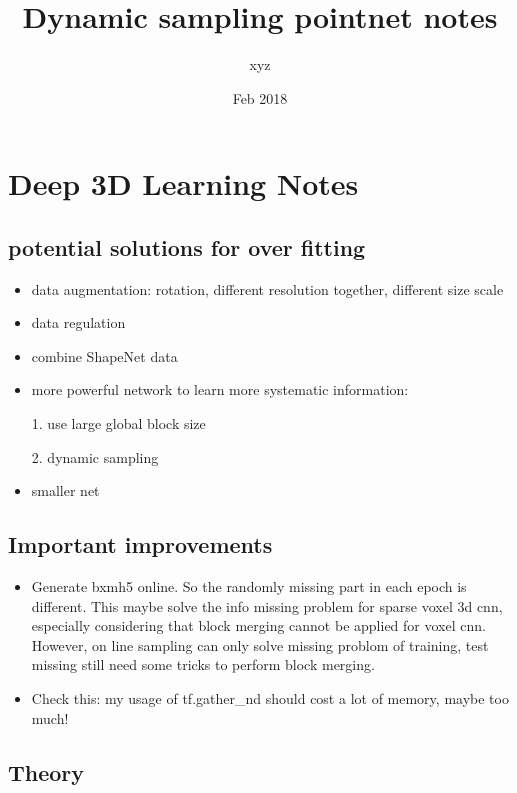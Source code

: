 \documentclass{article}
\title{Dynamic sampling pointnet notes}
\author{xyz}
\date{Feb 2018}
\begin{document}
\begin{titlepage}
\maketitle
\end{titlepage}	

\tableofcontents{}

\section{Deep 3D Learning Notes}

\subsection{potential solutions for over fitting}
\begin{itemize}
	\item data augmentation: rotation, different resolution together, different size scale
	\item data regulation
	\item combine ShapeNet data
	\item more powerful network to learn more systematic information:\par
	1. use large global block size\par
	2. dynamic sampling
	\item smaller net
\end{itemize}

\subsection{Important improvements}
\begin{itemize}
	\item Generate bxmh5 online. So the randomly missing part in each epoch is different. This maybe solve the info missing problem for sparse voxel 3d cnn, especially considering that block merging cannot be applied for voxel cnn. However, on line sampling can only solve missing problom of training, test missing still need some tricks to perform block merging.
	\item Check this: my usage of tf.gather\_nd should cost a lot of memory, maybe too much!
\end{itemize}

\subsection{Theory}
\end{document}
